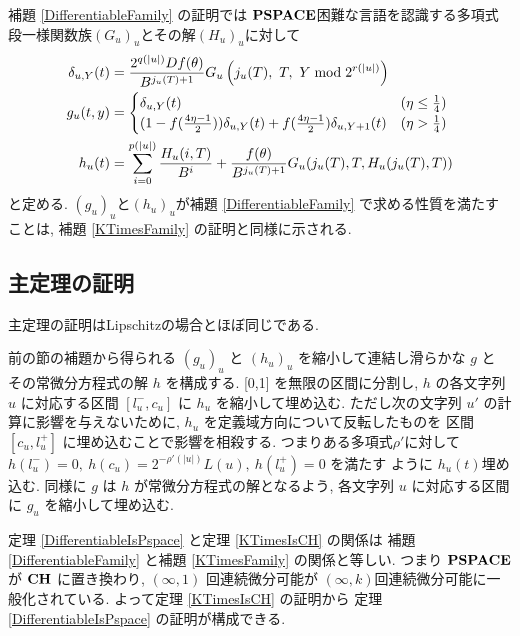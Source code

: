 補題 \ref{DifferentiableFamily} の証明では
 $\mathbf{PSPACE}$困難な言語を認識する多項式段一様関数族$(G_u)_u$とその解$(H_u)_u$に対して
 \begin{align}
  \delta_{u, Y} (t) &= \frac{2^{q(|u|)} D f(\theta)}{B^{{j_u(T)+1}}} 
   G_u\left( j_u(T),\ T,\ Y \bmod 2^{r(|u|)} \right)
  \\
  g_u(t,y) 
  &= \begin{cases}
     \delta_{u, Y}(t)
     & (\eta \le \frac 1 4)
     \\
     ( 1-f ( \frac{4\eta-1}{2})) \delta_{u, Y}(t) 
     + f ( \frac{4\eta-1}{2}) \delta_{u,Y+1}(t)
     & (\eta > \frac 1 4)
    \end{cases}
  \\
  h_u(t) &= \sum^{p(|u|)}_{i=0} \frac{H_u(i, T)}{B^{i}}  
  + \frac{f(\theta)}{B^{{j_u(T)+1}}} G_u(j_u(T), T, H_u(j_u(T), T)) 
 \end{align}
 と定める.
 $(g_u)_u$と$(h_u)_u$が補題 \ref{DifferentiableFamily} で求める性質を満たすことは,
 補題 \ref{KTimesFamily} の証明と同様に示される.


\subsection{主定理の証明}

 主定理の証明はLipschitzの場合とほぼ同じである.
 
 前の節の補題から得られる $(g_u)_u$ と $(h_u)_u$ を縮小して連結し滑らかな $g$ と
 その常微分方程式の解 $h$ を構成する.
 [0,1] を無限の区間に分割し, $h$ の各文字列 $u$ に対応する区間
 $[l^-_u, c_u]$ に $h_u$ を縮小して埋め込む. 
 ただし次の文字列 $u'$ の計算に影響を与えないために,
 $h_u$ を定義域方向について反転したものを
 区間 $[c_u, l^+_u]$ に埋め込むことで影響を相殺する.
 つまりある多項式$\rho'$に対して
 $h(l^-_u) = 0,\ h(c_u) = 2^{-\rho'(|u|)} L(u),\ h(l^+_u) = 0$ を満たす
 ように $h_u(t)$埋め込む.
 同様に $g$ は $h$ が常微分方程式の解となるよう,
 各文字列 $u$ に対応する区間に $g_u$ を縮小して埋め込む.

 定理 \ref{DifferentiableIsPspace} と定理 \ref{KTimesIsCH} の関係は
 補題 \ref{DifferentiableFamily} と補題 \ref{KTimesFamily} の関係と等しい.
 つまり $\mathbf{PSPACE}$ が $\mathbf{CH}$ に置き換わり,
 $(\infty, 1)$ 回連続微分可能が $(\infty, k)$回連続微分可能に一般化されている.
 よって定理 \ref{KTimesIsCH} の証明から
 定理 \ref{DifferentiableIsPspace} の証明が構成できる.

